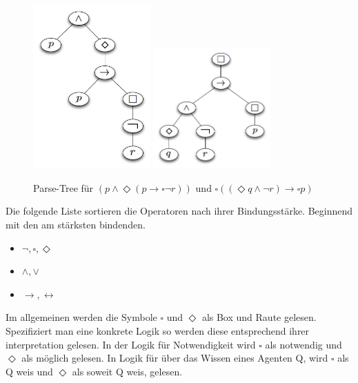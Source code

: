 \begin{figure}[h!]
	\begin{center}
  	\includegraphics[width=0.4\textwidth]{./Images/mmFormel01.png}
		\includegraphics[width=0.4\textwidth]{./Images/mmFormel02.png}
  	\caption{Parse-Tree für $(p \wedge \Diamond(p \rightarrow \square \neg r))$ und 
		$\square((\Diamond q \wedge \neg r) \rightarrow \square p )$}
		\label{fig:mmFormel01}
	\end{center}
\end{figure}
%
Die folgende Liste sortieren die Operatoren nach ihrer Bindungsstärke. 
Beginnend mit den am stärksten bindenden.\\
\label{bindungsstaerke}
\begin{itemize}
	\item $\neg, \square, \Diamond$
	\item $\wedge, \vee$
	\item $\rightarrow, \leftrightarrow$
\end{itemize}
%
Im allgemeinen werden die Symbole $\square$ und $\Diamond$ als Box und Raute gelesen. 
Spezifiziert man eine konkrete Logik so werden diese entsprechend ihrer interpretation gelesen. In der Logik für Notwendigkeit wird $\square$ als notwendig und $\Diamond$ als möglich gelesen. In Logik für über das Wissen eines Agenten Q, wird $\square$ als Q weis und $\Diamond$ als soweit Q weis, gelesen.


